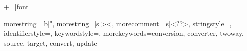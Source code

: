 
\newcommand{\lstinlineabstract}[1]{\lstinline[emph={#1},emphstyle=\textit, breaklines = true]~#1~}

\newcommand{\TODO}[1]{\textcolor{Mulberry}{\textbf{TODO:#1}}}

\newcommand{\lstinln}[1]{\texttt{#1}}
+=[font=\sffamily]
\newcommand{\zamk}{\textit{\texttt{zamk}}\xspace}
\newcommand{\gluer}{\textit{Gluer}\xspace}



{
  morestring=[b]",
  morestring=[s]{>}{<},
  morecomment=[s]{<?}{?>},
  stringstyle=\color{black},
  identifierstyle=\color{darkblue},
  keywordstyle=\color{cyan},
  morekeywords={conversion, converter, twoway, source, target, convert, update}%
}